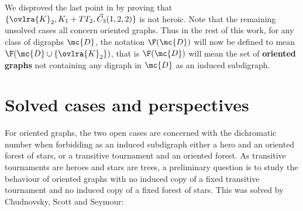 We disproved the last point in \cite{AACmulti} by proving that $\{\ovlra{K}_2, K_1 + TT_2, \vec C_{3}(1,2,2)\}$ is not heroic. Note that the remaining unsolved cases all concern oriented graphs. Thus in the rest of this work, for any class of digraphs $\mc{D}$, the notation $\F(\mc{D})$ will now be defined to mean $\F(\mc{D} \cup \{\ovlra{K}_2\})$, that is $\F(\mc{D})$ will mean the set of \textbf{oriented graphs} not containing any digraph in $\mc{D}$ as an induced subdigraph.







\section{Solved cases and perspectives}


\medskip

For oriented graphs, the two open cases are concerned with the dichromatic number when forbidding as an induced subdigraph either a hero and an oriented forest of stars, or a transitive tournament and an oriented forest. As transitive tournaments are heroes and stars are trees, a preliminary question is to study the behaviour of oriented graphs with no induced copy of a fixed transitive tournament and no induced copy of a fixed forest of stars. This was solved by Chudnovsky, Scott and Seymour:

